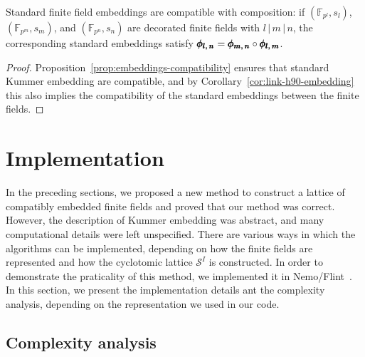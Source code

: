 \begin{prop}
\label{prop:ff-embeddings-compatibility}
Standard finite field embeddings are compatible with composition:
if $(\mathbb{F}_{p^l},s_l)$, $(\mathbb{F}_{p^m},s_m)$, and
$(\mathbb{F}_{p^n},s_n)$ are decorated finite fields
with $l\,|\,m\,|\,n$, the corresponding standard embeddings
satisfy $\pmb{\phi_{{l},\,{n}}}=\pmb{\phi_{{m},\,{n}}}\circ\pmb{\phi_{{l},\,{m}}}$.
\end{prop}
\begin{proof}
Proposition~\ref{prop:embeddings-compatibility} ensures that standard Kummer
embedding are compatible, and by Corollary~\ref{cor:link-h90-embedding} this
also implies the compatibility of the standard embeddings between the finite
fields.
\end{proof}

\section{Implementation}

In the preceding sections, we proposed a new method to construct a lattice of
compatibly embedded finite fields and proved that our method was correct.
However, the description of Kummer embedding was abstract, and many
computational details were left unspecified. There are various ways in which the
algorithms can be implemented, depending on how the finite fields are
represented and how the cyclotomic lattice $\mathcal S^I$ is constructed. In
order to demonstrate the praticality of this method, we implemented it in
Nemo/Flint~\cite{Nemo, Flint}. In this section, we present the implementation
details ant the complexity analysis, depending on the representation we used in
our code.

\subsection{Complexity analysis}

